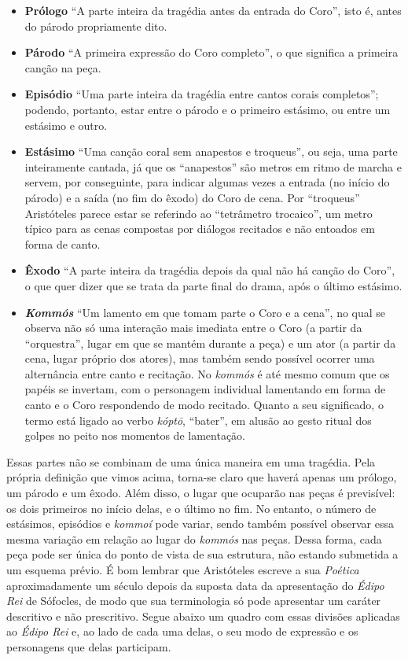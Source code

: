 \begin{itemize}
\item \textbf{Prólogo} ``A parte inteira da tragédia antes da entrada do
Coro'', isto é, antes do párodo propriamente dito.

\item \textbf{Párodo} ``A primeira expressão do Coro completo'', o que
significa a primeira canção na peça.

\item \textbf{Episódio} ``Uma parte inteira da tragédia entre cantos corais
completos''; podendo, portanto, estar entre o párodo e o primeiro
estásimo, ou entre um estásimo e outro.

\item \textbf{Estásimo} ``Uma canção coral sem anapestos e troqueus'', ou
seja, uma parte inteiramente cantada, já que os ``anapestos'' são metros
em ritmo de marcha e servem, por conseguinte, para indicar algumas vezes
a entrada (no início do párodo) e a saída (no fim do êxodo) do Coro de
cena. Por ``troqueus'' Aristóteles parece estar se referindo ao
``tetrâmetro trocaico'', um metro típico para as cenas compostas por
diálogos recitados e não entoados em forma de canto.

\item \textbf{Êxodo} ``A parte inteira da tragédia depois da qual não há
canção do Coro'', o que quer dizer que se trata da parte final do drama,
após o último estásimo.

\item \textbf{\emph{Kommós}} ``Um lamento em que tomam parte o Coro e a
cena'', no qual se observa não só uma interação mais imediata entre o
Coro (a partir da ``orquestra'', lugar em que se mantém durante a peça) e um
ator (a partir da cena, lugar próprio dos atores), mas também sendo
possível ocorrer uma alternância entre canto e recitação. No
\emph{kommós} é até mesmo comum que os papéis se invertam, com o
personagem individual lamentando em forma de canto e o Coro respondendo
de modo recitado. Quanto a seu significado, o termo está ligado ao verbo
\emph{kóptō}, ``bater'', em alusão ao gesto ritual dos golpes no peito
nos momentos de lamentação.
\end{itemize}

Essas partes não se combinam de uma única maneira em uma tragédia. Pela
própria definição que vimos acima, torna-se claro que haverá apenas um
prólogo, um párodo e um êxodo. Além disso, o lugar que ocuparão nas
peças é previsível: os dois primeiros no início delas, e o último no
fim. No entanto, o número de estásimos, episódios e \emph{kommoí} pode
variar, sendo também possível observar essa mesma variação em relação ao
lugar do \emph{kommós} nas peças. Dessa forma, cada peça pode ser única
do ponto de vista de sua estrutura, não estando submetida a um esquema
prévio. É bom lembrar que Aristóteles escreve a sua \emph{Poética}
aproximadamente um século depois da suposta data da apresentação do
\emph{Édipo Rei} de Sófocles, de modo que sua terminologia só pode
apresentar um caráter descritivo e não prescritivo. Segue abaixo um
quadro com essas divisões aplicadas ao \emph{Édipo Rei} e, ao lado de
cada uma delas, o seu modo de expressão e os personagens que delas
participam.


